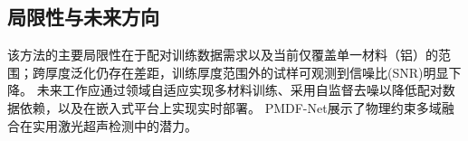 \subsection{局限性与未来方向}
\label{sec:conclusion-limitations}

该方法的主要局限性在于配对训练数据需求以及当前仅覆盖单一材料（铝）的范围；跨厚度泛化仍存在差距，训练厚度范围外的试样可观测到信噪比(SNR)明显下降。
未来工作应通过领域自适应实现多材料训练、采用自监督去噪以降低配对数据依赖，以及在嵌入式平台上实现实时部署。
PMDF-Net展示了物理约束多域融合在实用激光超声检测中的潜力。
